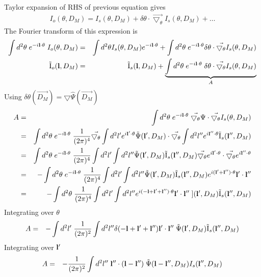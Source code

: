 \documentclass[12pt]{article}
\newcommand{\beqa}{\begin{eqnarray}}
\newcommand{\eeqa}{\end{eqnarray}}
\def\l{{\bf l}}
\def\iul{{\rm I}}
\def\il{{\tilde{\rm I}}}
\def\dtheta{\delta \theta}
\numberwithin{equation}{section}
\begin{document}
Taylor expansion of RHS of previous equation gives
\beqa
I_o(\theta,D_M) = I_s(\theta,D_M) + \delta\theta \cdot \vec{\bigtriangledown_\theta} I_s(\theta,D_M) + \ldots
\eeqa
The Fourier transform of this expression is
\begin{eqnarray}
\int d^2 \theta \; e^{-i \l \cdot \theta} \; I_o(\theta,D_M) &=& \int d^2 \theta I_s(\theta,D_M) e^{-i \l \cdot \theta} + \int d^2 \theta \; e^{-i\l \cdot \theta} \delta\theta \cdot \vec{\bigtriangledown_\theta} I_s(\theta,D_M)\nonumber\\
\il_o(\l,D_M) &=& \il_s(\l,D_M) + \underbrace{\int d^2 \theta \; e^{-i\l \cdot \theta} \; \delta\theta \cdot \vec{\bigtriangledown_\theta} I_s(\theta,D_M)}_{A}
\end{eqnarray}
Using $\dtheta(\vec{D_M})=\bigtriangledown \hat{\Psi}(\vec{D_M})$
\begin{eqnarray}
A &= & \int d^2 \theta \; e^{-i\l \cdot \theta} \; \vec{\bigtriangledown_\theta} \Psi \cdot \vec{\bigtriangledown_\theta} I_s(\theta,D_M) \\
&= & \int d^2 \theta \; e^{-i\l \cdot \theta} \; \frac{1}{(2\pi)^4}  \vec{\bigtriangledown_\theta} \int d^2 l'  e^{i\l' \cdot \theta} \tilde{\Psi}(\l', D_M) \cdot \vec{\bigtriangledown_\theta} \int d^2 l''  e^{i\l'' \cdot \theta} \il_s(\l'',D_M)  \\
&= & \int d^2 \theta \; e^{-i\l \cdot \theta} \; \frac{1}{(2\pi)^4}  \int d^2 l' \int d^2 l''  \tilde{\Psi}(\l', D_M) \il_s(\l'',D_M) \vec{\bigtriangledown_\theta} e^{i\l' \cdot \theta}  \cdot  \vec{\bigtriangledown_\theta}  e^{i\l'' \cdot \theta}   \\
&= & - \int d^2 \theta \; e^{-i\l \cdot \theta} \;  \frac{1}{(2\pi)^4}  \int d^2 l' \int d^2 l''  \tilde{\Psi}(\l', D_M) \il_s(\l'',D_M) e^{i(\l' + \l'') \cdot \theta} \l' \cdot \l''\\
&= & -\int d^2 \theta \; \frac{1}{(2\pi)^4}  \int d^2 l' \int d^2 l''  e^{i(-\l + \l' + \l'') \cdot \theta} \l' \cdot \l'' \; ](\l', D_M) \il_s(\l'',D_M)
\end{eqnarray}
Integrating over $ \theta $
\begin{eqnarray}
A &= &- \int d^2 l' \; \frac{1}{(2\pi)^2}  \int d^2 l'' \delta(-\l + \l' + \l'') \l' \cdot \l'' \; \tilde{\Psi}(\l', D_M) \il_s(\l'',D_M)
\end{eqnarray}
Integrating over $ \l' $
\begin{eqnarray}
A &= &- \frac{1}{(2\pi)^2} \int d^2 l'' \;  \l'' \cdot (\l - \l'') \; \tilde{\Psi}(\l - \l'', D_M) I_s(\l'',D_M)
\end{eqnarray}
\end{document}
